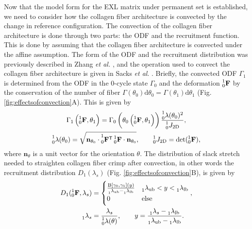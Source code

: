     Now that the model form for the EXL matrix under permanent set is established, we need to consider how the collagen fiber architecture is convected by the change in reference configuration. The convection of the collagen fiber architecture is done through two parts: the ODF and the recruitment function. This is done by assuming that the collagen fiber architecture is convected under the affine assumption\cite{lee_presence_2015}. The form of the ODF and the recruitment distribution was previously described in Zhang \textit{et al.} \cite{zhang_meso_2016}, and the operation used to convect the collagen fiber architecture is given in Sacks \textit{et al}. \cite{sacks_novel_2016}. Briefly, the convected ODF $\Gamma_1$ is determined from the ODF in the 0-cycle state $\Gamma_0$ and the deformation $\prescript{1}{0}{\mathbf{F}}$ by the conservation of the number of fiber $\Gamma(\theta_0) \mathrm{d}\theta_0 = \Gamma(\theta_1) \mathrm{d}\theta_1$ (Fig. \ref{fig:effectsofconvection}A). This is given by
\begin{equation} \label{eq:pfODF}
\begin{gathered}
\Gamma_1\left( \prescript{1}{0}{\mathbf{F}},\theta_1 \right) = \Gamma_0\left( \theta_0\left( \prescript{1}{0}{\mathbf{F}},\theta_1\right)\right)\frac{\prescript{1}{0}{\lambda(\theta_0)}^2}{\prescript{1}{0}{J_\mathrm{2D}}}, \\
\prescript{1}{0}{\lambda(\theta_0)} = \sqrt{\mathbf{n}_{\theta_0}\cdot  \prescript{1}{0}{\mathbf{F}^\mathsf{T}}  \prescript{1}{0}{\mathbf{F}} \cdot \mathbf{n}_{\theta_0}}, \qquad \prescript{1}{0}{J_\mathrm{2D}} =\det (\prescript{1}{0}{\mathbf{F}}),
\end{gathered}
\end{equation}
    where $\mathbf{n}_\theta$ is a unit vector for the orientation $\theta$. The distribution of slack stretch needed to straighten collagen fiber crimp after convection, in other words the recruitment distribution $D_1(\lambda_s)$ (Fig. \ref{fig:effectsofconvection}B), is given by
\begin{equation} \label{eq:pfrecruitment}
\begin{gathered}
D_1(\prescript{1}{0}{\mathbf{F}}, \lambda_s) = \begin{cases} \frac{\operatorname{B}[\gamma_0,\gamma_1](y)}{\prescript{}{1}{\lambda}_\mathrm{ub}-\prescript{}{1}{\lambda}_\mathrm{lb}} & \prescript{}{1}{\lambda}_\mathrm{ub} < y < \prescript{}{1}{\lambda}_\mathrm{lb} \\ 0 & \text{else}\end{cases}, \\
\qquad \prescript{}{1}{\lambda}_s = \frac{\lambda_s}{\prescript{1}{0}{\lambda}(\theta)}, \qquad y = \frac{\prescript{}{1}{\lambda}_s - \prescript{}{1}{\lambda}_\mathrm{lb}}{\prescript{}{1}{\lambda}_\mathrm{ub}-\prescript{}{1}{\lambda}_\mathrm{lb}}.
\end{gathered}
\end{equation}
